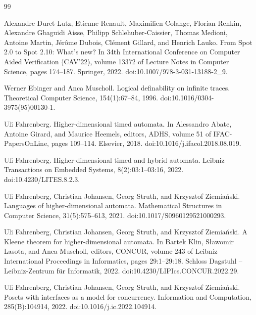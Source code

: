 \documentclass[10pt,a4paper]{article}
\begin{document}
\begin{thebibliography}{99}
\par\noindent    Alexandre Duret-Lutz, Etienne Renault, Maximilien Colange, Florian Renkin, Alexandre Gbaguidi Aisse, Philipp Schlehuber-Caissier, Thomas Medioni, Antoine Martin, Jérôme Dubois, Clément Gillard, and Henrich Lauko.  From Spot 2.0 to Spot 2.10: What’s new?  In 34th International Conference on Computer Aided Verification (CAV’22), volume 13372 of Lecture Notes in Computer Science, pages 174–187. Springer, 2022.  doi:10.1007/978-3-031-13188-2\_9.  

\par\noindent    Werner Ebinger and Anca Muscholl.  Logical definability on infinite traces.  Theoretical Computer Science, 154(1):67–84, 1996.  doi:10.1016/0304-3975(95)00130-1.  

\par\noindent    Uli Fahrenberg.  Higher-dimensional timed automata.  In Alessandro Abate, Antoine Girard, and Maurice Heemels, editors, ADHS, volume 51 of IFAC-PapersOnLine, pages 109–114. Elsevier, 2018.  doi:10.1016/j.ifacol.2018.08.019.  

\par\noindent    Uli Fahrenberg.  Higher-dimensional timed and hybrid automata.  Leibniz Transactions on Embedded Systems, 8(2):03:1–03:16, 2022.  doi:10.4230/LITES.8.2.3.  

\par\noindent    Uli Fahrenberg, Christian Johansen, Georg Struth, and Krzysztof Ziemiański.  Languages of higher-dimensional automata.  Mathematical Structures in Computer Science, 31(5):575–613, 2021.  doi:10.1017/S0960129521000293.  

\par\noindent    Uli Fahrenberg, Christian Johansen, Georg Struth, and Krzysztof Ziemiański.  A Kleene theorem for higher-dimensional automata.  In Bartek Klin, Sławomir Lasota, and Anca Muscholl, editors, CONCUR, volume 243 of Leibniz International Proceedings in Informatics, pages 29:1–29:18. Schloss Dagstuhl – Leibniz-Zentrum für Informatik, 2022.  doi:10.4230/LIPIcs.CONCUR.2022.29.  

\par\noindent    Uli Fahrenberg, Christian Johansen, Georg Struth, and Krzysztof Ziemiański.  Posets with interfaces as a model for concurrency.  Information and Computation, 285(B):104914, 2022.  doi:10.1016/j.ic.2022.104914.  


\end{thebibliography}
\end{document}
